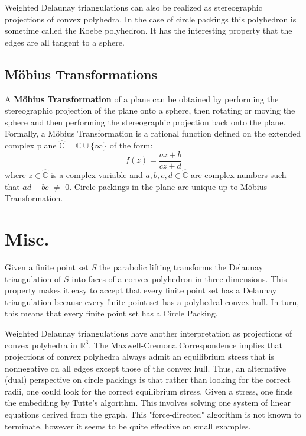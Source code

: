 \documentclass[11pt]{article}
\newcommand{\R}{\mathbb{R}}
\newcommand{\C}{\mathbb{C}}
\newcommand{\CP}{\hat{\mathbb{C}}}
\begin{document}
Weighted Delaunay triangulations can also be realized as stereographic projections of convex polyhedra. In the case of circle packings this polyhedron is sometime called the Koebe polyhedron. It has the interesting property that the edges are all tangent to a sphere.

\subsection{M\"{o}bius Transformations}
 A \textbf{M\"{o}bius Transformation} of a plane can be obtained by performing the stereographic projection of the plane onto a sphere, then rotating or moving the sphere and then performing the stereographic projection back onto the plane. 
  Formally, a M\"{o}bius Transformation is a rational function defined on the extended complex plane $\CP = \C\cup\{\infty\}$ of the form:
  \begin{equation} 
  	f(z) = \frac{az+b}{cz+d}
  \end{equation}
  where $z\in\CP$ is a complex variable and $a,b,c,d\in\CP$ are complex numbers such that $ad - bc$ $\neq$ $0$.
  Circle packings in the plane are unique up to M\"{o}bius Transformation.

\section{Misc.}
Given a finite point set $S$ the parabolic lifting transforms the Delaunay triangulation of $S$ into faces of a convex polyhedron in three dimensions. This property makes it easy to accept that every finite point set has a Delaunay triangulation because every finite point set has a polyhedral convex hull. In turn, this means that every finite point set has a Circle Packing.


    Weighted Delaunay triangulations have another interpretation as projections of convex polyhedra in $\R^3$. The Maxwell-Cremona Correspondence implies that projections of convex polyhedra always admit an equilibrium stress that is nonnegative on all edges except those of the convex hull. Thus, an alternative (dual) perspective on circle packings is that rather than looking for the correct radii, one could look for the correct equilibrium stress. Given a stress, one finds the embedding by Tutte's algorithm. This involves solving one system of linear equations derived from the graph. This "force-directed" algorithm is not known to terminate, however it seems to be quite effective on small examples. 


\end{document}
